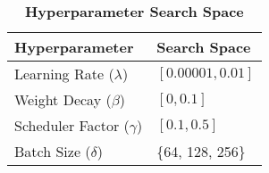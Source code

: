 \begin{table}[!ht]
    \centering
    \caption{\textbf{Hyperparameter Search Space}}
    \label{tab:hyperparameters}
    \begin{tabular}{ll}
    \toprule
    \textbf{Hyperparameter} & \textbf{Search Space} \\
    \midrule
    Learning Rate (\( \lambda \)) & $[0.00001, 0.01]$ \\
    Weight Decay (\( \beta \)) & $[0, 0.1]$ \\
    Scheduler Factor (\(\gamma\)) & $[0.1, 0.5]$ \\
    Batch Size (\(\delta\)) & \{64, 128, 256\} \\
    \bottomrule
    \end{tabular}
\end{table}
